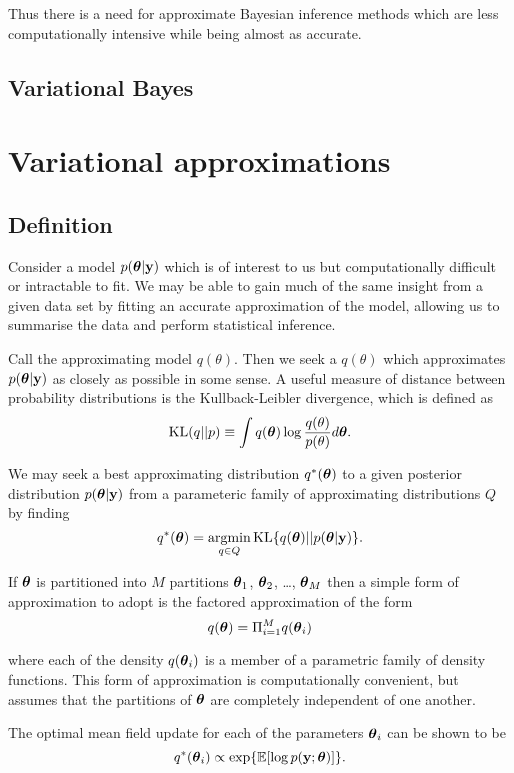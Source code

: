 \documentclass{amsart}[12pt]
\begin{document}
Thus there is a need for approximate Bayesian inference methods which are less computationally intensive while
being almost as accurate.

\subsection{Variational Bayes}
\section{Variational approximations}

\subsection{Definition}

Consider a model $p({\boldsymbol \theta}|{\bf y})$ which is of interest to us but computationally difficult or intractable to 
fit. We may be able to gain much of the same insight from a given data set by fitting an accurate approximation 
of the model, allowing us to summarise the data and perform statistical inference.

Call the approximating model $q(\theta)$. Then we seek a $q(\theta)$ which approximates $p({\boldsymbol \theta}|{\bf y})$
as closely as possible in some sense. A useful measure of distance between probability distributions is the
Kullback-Leibler divergence, which is defined as
\[
	\text{KL}(q || p) \equiv \int q({\boldsymbol \theta}) \log{\frac{q(\theta)}{p(\theta)}} d {\boldsymbol \theta}.
\]

We may seek a best approximating distribution $q^*({\boldsymbol \theta})$ to a given posterior distribution
$p({\boldsymbol \theta}|{\bf y})$ from a parameteric family of approximating distributions $Q$ by finding
\[
	q^*(\vtheta) = \argmin_{q \in Q} \KL \{ {q(\vtheta) || p(\vtheta|\vy)} \}.
\]

If ${\boldsymbol \theta}$ is partitioned into $M$ partitions ${\boldsymbol \theta}_1$, ${\boldsymbol \theta}_2$, \ldots, ${\boldsymbol \theta}_M$ then a 
simple form of approximation to adopt is the factored approximation of the form
\[
	q({\boldsymbol \theta}) = \Pi_{i=1}^M q({\boldsymbol \theta}_i)
\]

where each of the density $q({\boldsymbol \theta}_i)$ is a member of a parametric family of density functions. This form of
approximation is computationally convenient, but assumes that the partitions of ${\boldsymbol \theta}$ are completely
independent of one another.

The optimal mean field update for each of the parameters ${\boldsymbol \theta}_i$ can be shown to be
\[
	q^*({\boldsymbol \theta}_i) \propto \exp \{ \mathbb{E} [\log p({\bf y}; {\boldsymbol \theta})] \}.
\]
\end{document}
